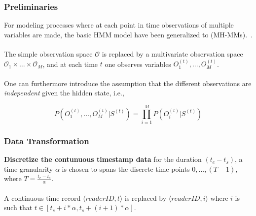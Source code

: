 
\begin{frame}
\frametitle{Preliminaries}

For modeling processes where at each point in time observations of multiple variables are made, the basic HMM model have been generalized to (MH-MMs).~\cite{kirshner2005modeling}.\\~\\

The simple observation space $\mathcal{O}$ is replaced by a multivariate observation space $\mathcal{O}_1 \times \hdots \times \mathcal{O}_M$, and at each time $t$ one observes variables $O^{(t)}_1,...,O^{(t)}_M$.\\~\\

One can furthermore introduce the assumption that the different observations are \emph{independent} given the hidden state, i.e.,

\pause

\begin{equation}
  P(O^{(t)}_1,...,O^{(t)}_M | S^{(t)}) = \prod_{i=1}^M P(O^{(t)}_i | S^{(t)})
\end{equation}

\end{frame}


\begin{frame}
\frametitle{Data Transformation}

\textbf{Discretize the contunuous timestamp data} \quad for the duration $(t_e - t_s)$, a time granularity $\alpha$ is chosen to spans the discrete time points $0,...,(T-1)$, where $T = \frac{t_e - t_s}{\alpha}$.\\~\\

A continuous time record $\langle readerID, t \rangle$ is replaced by $\langle readerID, i \rangle$ where $i$ is such that $t \in [t_s + i * \alpha, t_s +(i+1) * \alpha]$.


\end{frame}


